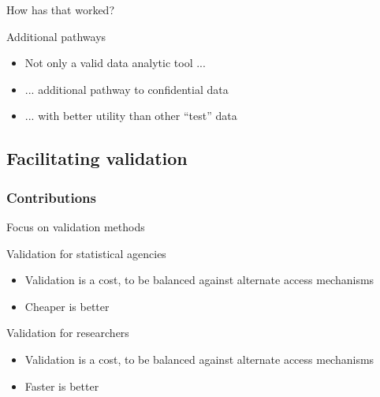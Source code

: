 \begin{frame}{How has that worked?}
\begin{block}{Additional pathways}
\begin{itemize}[<+->]
\item Not only a valid data analytic tool ...
\item ... additional pathway to confidential data 
\item ... with better utility than other ``test'' data 
\end{itemize}
\end{block}
\end{frame}







\subsection[Validation]{Facilitating validation}
\begin{frame}
\mytitlepage{\insertsubsection}
\end{frame}

\begin{frame}
\frametitle{Contributions}
\begin{block}{
Focus on validation methods}

\end{block}

\begin{block}{Validation for statistical agencies}
\begin{itemize}
	\item Validation is a cost, to be balanced against alternate access mechanisms
	\item Cheaper is better

\end{itemize}
\end{block}
\begin{block}{Validation for researchers}
\begin{itemize}
	\item Validation is a cost, to be balanced against alternate access mechanisms
	\item Faster is better
\end{itemize}
\end{block}

\end{frame}


